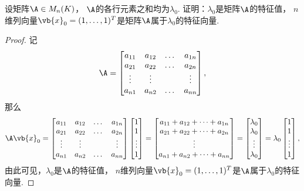 \begin{example}
设矩阵\(\A \in M_n(K)\)，
\(\A\)的各行元素之和均为\(\lambda_0\).
证明：\(\lambda_0\)是矩阵\(\A\)的特征值，
\(n\)维列向量\(\vb{x}_0=(1,\dotsc,1)^T\)是矩阵\(\A\)属于\(\lambda_0\)的特征向量.
\begin{proof}
记\[
	\A
	= \begin{bmatrix}
		a_{11} & a_{12} & \dots & a_{1n} \\
		a_{21} & a_{22} & \dots & a_{2n} \\
		\vdots & \vdots & & \vdots \\
		a_{n1} & a_{n2} & \dots & a_{nn}
	\end{bmatrix},
\]
那么\[
	\A \vb{x}_0
	= \begin{bmatrix}
		a_{11} & a_{12} & \dots & a_{1n} \\
		a_{21} & a_{22} & \dots & a_{2n} \\
		\vdots & \vdots & & \vdots \\
		a_{n1} & a_{n2} & \dots & a_{nn}
	\end{bmatrix}
	\begin{bmatrix}
		1 \\ 1 \\ \vdots \\ 1
	\end{bmatrix}
	= \begin{bmatrix}
		a_{11} + a_{12} + \dotsb + a_{1n} \\
		a_{21} + a_{22} + \dotsb + a_{2n} \\
		\vdots \\
		a_{n1} + a_{n2} + \dotsb + a_{nn}
	\end{bmatrix}
	= \begin{bmatrix}
		\lambda_0 \\ \lambda_0 \\ \vdots \\ \lambda_0
	\end{bmatrix}
	= \lambda_0
	\begin{bmatrix}
		1 \\ 1 \\ \vdots \\ 1
	\end{bmatrix},
\]
由此可见，\(\lambda_0\)是\(\A\)的特征值，
\(n\)维列向量\(\vb{x}_0=(1,\dotsc,1)^T\)是\(\A\)属于\(\lambda_0\)的特征向量.
\end{proof}
\end{example}

